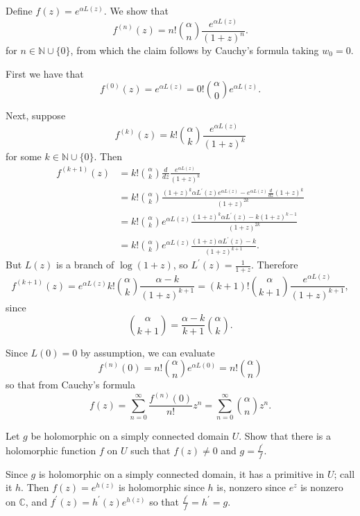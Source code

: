 \documentclass{article}
\newcounter{Problem}
\newenvironment{Problem}{\begin{Exercise}[name={Problem},
                                          counter={Problem}]}
                        {\end{Exercise}}
\begin{document}
\begin{Answer}
Define $f(z) = e^{\alpha L(z)}$. We show that
$$
f^{(n)}(z) = n! {\alpha \choose n} \frac{e^{\alpha L(z)}}{(1 + z)^n}.
$$
for $n \in \mathbb{N} \cup \{0\}$, from which the claim follows by
Cauchy's formula taking $w_0 = 0$.

First we have that
$$
  f^{(0)}(z)
= e^{\alpha L(z)}
= 0! {\alpha \choose 0} e^{\alpha L(z)}.
$$

Next, suppose
$$
f^{(k)}(z) = k! {\alpha \choose k} \frac{e^{\alpha L(z)}}{(1 + z)^k}
$$
for some $k \in \mathbb{N} \cup \{ 0 \}$. Then
\begin{align*}
   f^{(k+1)}(z)
&= k! {\alpha \choose k}
   \frac{d}{dz}
   \frac{e^{\alpha L(z)}}{(1 + z)^k} \\
&= k! {\alpha \choose k}
   \frac{ (1 + z)^k \alpha L^\prime(z) e^{\alpha L(z)}
        - e^{\alpha L(z)} \frac{d}{dz} (1 + z)^k
   }
   {(1 + z)^{2k}} \\
&= k! {\alpha \choose k}
   e^{\alpha L(z)}
   \frac{(1 + z)^k \alpha L^{\prime}(z) - k (1 + z)^{k-1}}
        {(1 + z)^{2k}} \\
&= k! {\alpha \choose k}
   e^{\alpha L(z)}
   \frac{(1 + z) \alpha L^\prime(z) - k}{(1 + z)^{k + 1}}.
\end{align*}
But $L(z)$ is a branch of $\log (1 + z)$, so $L^\prime(z) = \frac{1}{1 + z}$.
Therefore
$$
  f^{(k+1)}(z)
= e^{\alpha L(z)} k!
  {\alpha \choose k}
  \frac{\alpha - k}{(1 + z)^{k+1}}
= (k + 1)! {\alpha \choose k + 1} \frac{e^{\alpha L(z)}}{(1 + z)^{k+1}},
$$
since
$$
  {\alpha \choose k + 1}
= \frac{\alpha - k}{k+1} {\alpha \choose k}.
$$

Since $L(0) = 0$ by assumption, we can evaluate
$$
  f^{(n)}(0)
= n! {\alpha \choose n} e^{\alpha L(0)}
= n! {\alpha \choose n}
$$
so that from Cauchy's formula
$$
  f(z)
= \sum_{n=0}^\infty \frac{f^{(n)}(0)}{n!} z^n
= \sum_{n=0}^\infty {\alpha \choose n} z^n.
$$

\end{Answer}

\begin{Problem}
Let $g$ be holomorphic on a simply connected domain $U$. Show that there is a
holomorphic function $f$ on $U$ such that $f(z) \neq 0$ and
$g = \frac{f^\prime}{f}$.
\end{Problem}

\begin{Answer}
Since $g$ is holomorphic on a simply connected domain, it has a primitive in
$U$; call it $h$. Then $f(z) = e^{h(z)}$ is holomorphic since $h$ is,
nonzero since $e^z$ is nonzero on $\mathbb{C}$, and
$f^\prime(z) = h^\prime(z) e^{h(z)}$ so that $\frac{f^\prime}{f} = h^\prime = g$.
\end{Answer}
\end{document}
